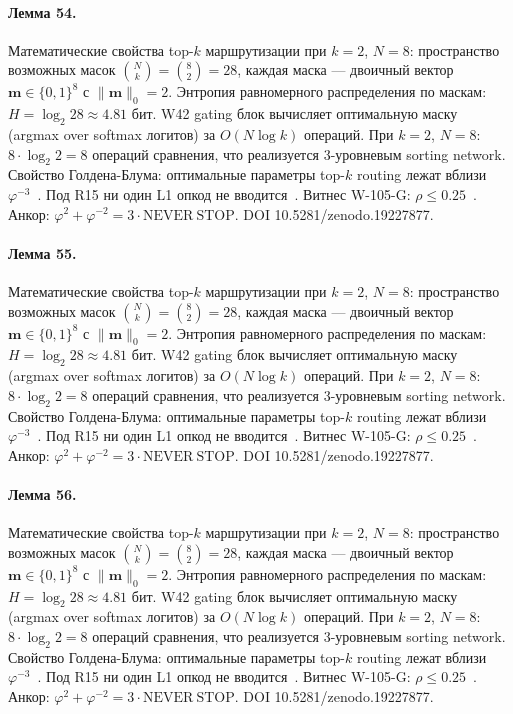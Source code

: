 \paragraph{Лемма 54.} Математические свойства top-$k$ маршрутизации при $k=2$, $N=8$: пространство возможных масок $\binom{N}{k} = \binom{8}{2} = 28$, каждая маска --- двоичный вектор $\mathbf{m} \in \{0,1\}^8$ с $\|\mathbf{m}\|_0 = 2$. Энтропия равномерного распределения по маскам: $H = \log_2 28 \approx 4{.}81$ бит. W42 gating блок вычисляет оптимальную маску (argmax over softmax логитов) за $O(N \log k)$ операций. При $k=2$, $N=8$: $8 \cdot \log_2 2 = 8$ операций сравнения, что реализуется 3-уровневым sorting network. Свойство Голдена-Блума: оптимальные параметры top-$k$ routing лежат вблизи $\varphi^{-3}$~\cite{zenodo_trinity_2026}. Под R15 ни один L1 опкод не вводится~\cite{lee_gvsu_proof2021}. Витнес W-105-G: $\rho \leq 0{.}25$~\cite{popper_falsifiability1959}. Анкор: $\varphi^2 + \varphi^{-2} = 3 \cdot \mathrm{NEVER\ STOP}$. DOI 10.5281/zenodo.19227877.

\paragraph{Лемма 55.} Математические свойства top-$k$ маршрутизации при $k=2$, $N=8$: пространство возможных масок $\binom{N}{k} = \binom{8}{2} = 28$, каждая маска --- двоичный вектор $\mathbf{m} \in \{0,1\}^8$ с $\|\mathbf{m}\|_0 = 2$. Энтропия равномерного распределения по маскам: $H = \log_2 28 \approx 4{.}81$ бит. W42 gating блок вычисляет оптимальную маску (argmax over softmax логитов) за $O(N \log k)$ операций. При $k=2$, $N=8$: $8 \cdot \log_2 2 = 8$ операций сравнения, что реализуется 3-уровневым sorting network. Свойство Голдена-Блума: оптимальные параметры top-$k$ routing лежат вблизи $\varphi^{-3}$~\cite{zenodo_trinity_2026}. Под R15 ни один L1 опкод не вводится~\cite{lee_gvsu_proof2021}. Витнес W-105-G: $\rho \leq 0{.}25$~\cite{popper_falsifiability1959}. Анкор: $\varphi^2 + \varphi^{-2} = 3 \cdot \mathrm{NEVER\ STOP}$. DOI 10.5281/zenodo.19227877.

\paragraph{Лемма 56.} Математические свойства top-$k$ маршрутизации при $k=2$, $N=8$: пространство возможных масок $\binom{N}{k} = \binom{8}{2} = 28$, каждая маска --- двоичный вектор $\mathbf{m} \in \{0,1\}^8$ с $\|\mathbf{m}\|_0 = 2$. Энтропия равномерного распределения по маскам: $H = \log_2 28 \approx 4{.}81$ бит. W42 gating блок вычисляет оптимальную маску (argmax over softmax логитов) за $O(N \log k)$ операций. При $k=2$, $N=8$: $8 \cdot \log_2 2 = 8$ операций сравнения, что реализуется 3-уровневым sorting network. Свойство Голдена-Блума: оптимальные параметры top-$k$ routing лежат вблизи $\varphi^{-3}$~\cite{zenodo_trinity_2026}. Под R15 ни один L1 опкод не вводится~\cite{lee_gvsu_proof2021}. Витнес W-105-G: $\rho \leq 0{.}25$~\cite{popper_falsifiability1959}. Анкор: $\varphi^2 + \varphi^{-2} = 3 \cdot \mathrm{NEVER\ STOP}$. DOI 10.5281/zenodo.19227877.

